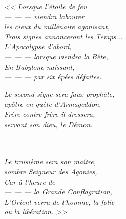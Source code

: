 \documentclass[11pt,twoside,a4paper]{book}
\begin{document}
\begin{itemize}
\begin{minipage}[ht]{0.30\textwidth}
		\emph{\small
		<< Lorsque l'{\'e}toile de feu ~\\ --- --- --- viendra labourer~\\
		les cieux du mill{\'e}naire agonisant,~\\
		Trois signes annonceront les Temps...~\\
		L'Apocalypse d'abord, ~\\ --- --- --- lorsque viendra la B{\^e}te,~\\
		En Babylone naissant, ~\\ --- --- --- par six {\'e}p{\'e}es d{\'e}faites. }
\end{minipage} \hfill \begin{minipage}[ht]{0.30\textwidth}
		\emph{\small Le second signe sera faux proph{\`e}te,~\\
		ap{\^o}tre en qu{\^e}te d'Armageddon,~\\
		Fr{\`e}re contre fr{\`e}re il dressera,~\\
		servant son dieu, le D{\'e}mon.}~\\~\\~\\
\end{minipage} \hfill \begin{minipage}[ht]{0.30\textwidth}
		\emph{\small Le troisi{\`e}me sera son ma{\^i}tre,~\\
		sombre Seigneur des Agonies,~\\
		Car {\`a} l'heure de ~\\ --- --- --- la Grande Conflagration,~\\
		L'Orient verra de l'homme, la folie~\\
		ou la lib{\'e}ration. >>}
\end{minipage}~\\~\\


\end{itemize}
\end{document}
